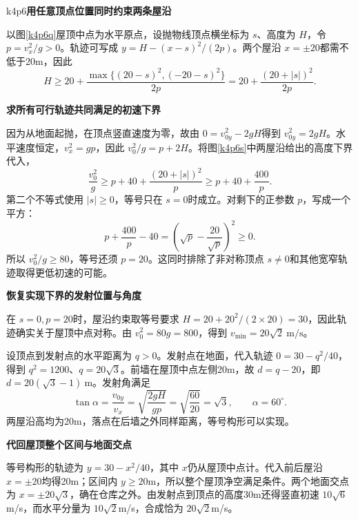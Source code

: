 \LectureAnswerSection

\begin{drillsolution}{k4p6}\textbf{用任意顶点位置同时约束两条屋沿}\par\nobreak
以图\ref{k4p6q}屋顶中点为水平原点，设抛物线顶点横坐标为 $s$、高度为 $H$，令 $p=v_x^2/g>0$。轨迹可写成 $y=H-(x-s)^2/(2p)$。两个屋沿 $x=\pm20$都需不低于20m，因此
\[H\ge20+\frac{\max\{(20-s)^2,(-20-s)^2\}}{2p}=20+\frac{(20+|s|)^2}{2p}.\]



\par\medskip{}\noindent\textbf{求所有可行轨迹共同满足的初速下界}\par\nobreak
因为从地面起抛，在顶点竖直速度为零，故由 $0=v_{0y}^2-2gH$得到 $v_{0y}^2=2gH$。水平速度恒定，$v_x^2=gp$，因此 $v_0^2/g=p+2H$。将图\ref{k4p6s}中两屋沿给出的高度下界代入，
\[
 \frac{v_0^2}{g}\ge p+40+\frac{(20+|s|)^2}{p}
 \ge p+40+\frac{400}{p}.
\]
第二个不等式使用 $|s|\ge0$，等号只在 $s=0$时成立。对剩下的正参数 $p$，写成一个平方：
\[
 p+\frac{400}{p}-40
 =\left(\sqrt p-\frac{20}{\sqrt p}\right)^2\ge0.
\]
所以 $v_0^2/g\ge80$，等号还须 $p=20$。这同时排除了非对称顶点 $s\ne0$和其他宽窄轨迹取得更低初速的可能。


\par\medskip{}\noindent\textbf{恢复实现下界的发射位置与角度}\par\nobreak
在 $s=0,p=20$时，屋沿约束取等号要求 $H=20+20^2/(2\times20)=30$，因此轨迹确实关于屋顶中点对称。由 $v_0^2=80g=800$，得到 $\boxed{v_{\min}=20\sqrt2\ \mathrm{m/s}}$。

设顶点到发射点的水平距离为 $q>0$。发射点在地面，代入轨迹 $0=30-q^2/40$，得到 $q^2=1200$、$q=20\sqrt3$。前墙在屋顶中点左侧20m，故 $d=q-20$，即 $\boxed{d=20(\sqrt3-1)\ \mathrm m}$。发射角满足
\[
 \tan\alpha=\frac{v_{0y}}{v_x}
 =\sqrt{\frac{2gH}{gp}}=\sqrt{\frac{60}{20}}=\sqrt3,
 \qquad \boxed{\alpha=60^\circ}.
\]
两屋沿高均为20m，落点在后墙之外同样距离，等号构形可以实现。



\par\medskip{}\noindent\textbf{代回屋顶整个区间与地面交点}\par\nobreak
等号构形的轨迹为 $y=30-x^2/40$，其中 $x$仍从屋顶中点计。代入前后屋沿 $x=\pm20$均得20m；区间内 $y\ge20$m，所以整个屋顶净空满足条件。两个地面交点为 $x=\pm20\sqrt3$，确在仓库之外。由发射点到顶点的高度30m还得竖直初速 $10\sqrt6$m/s，而水平分量为 $10\sqrt2$m/s，合成恰为 $20\sqrt2$m/s。\end{drillsolution}

